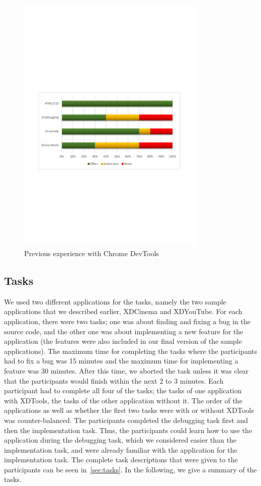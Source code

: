 \begin{figure}[H]
  \centering
    \includegraphics[width=0.8\textwidth]{images/charts/devtools_xp.pdf}
	\caption[Previous experience with Chrome DevTools]{Previous experience with Chrome DevTools}
	\label{fig:devtools_xp}
\end{figure}

\subsection{Tasks}

We used two different applications for the tasks, namely the two sample applications that we described earlier, XDCinema and XDYouTube. For each application, there were two tasks; one was about finding and fixing a bug in the source code, and the other one was about implementing a new feature for the application (the features were also included in our final version of the sample applications). The maximum time for completing the tasks where the participants had to fix a bug was 15 minutes and the maximum time for implementing a feature was 30 minutes. After this time, we aborted the task unless it was clear that the participants would finish within the next 2 to 3 minutes. Each participant had to complete all four of the tasks; the tasks of one application with XDTools, the tasks of the other application without it. The order of the applications as well as whether the first two tasks were with or without XDTools was counter-balanced. The participants completed the debugging task first and then the implementation task. Thus, the participants could learn how to use the application during the debugging task, which we considered easier than the implementation task, and were already familiar with the application for the implementation task. The complete task descriptions that were given to the participants can be seen in~\ref{sec:tasks}. In the following, we give a summary of the tasks.

